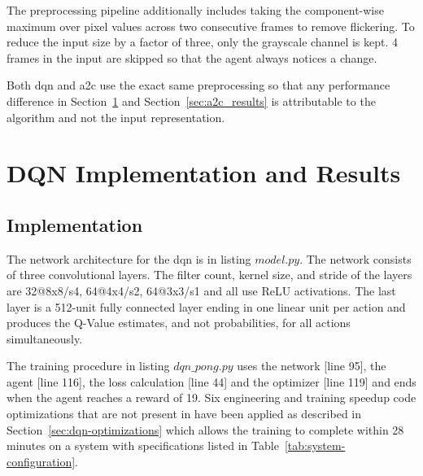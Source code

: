 The preprocessing pipeline \citep[p.~534]{mnihHumanlevelControlDeep2015} additionally includes taking the component-wise maximum over pixel values across two consecutive frames to remove flickering. To reduce the input size by a factor of three, only the grayscale channel is kept. 4 frames in the input are skipped so that the agent always notices a change.

Both \acrshort{dqn} and \acrshort{a2c} use the exact same preprocessing so that any performance difference in Section~\ref{sec:dqn_results} and Section~\ref{sec:a2c_results} is attributable to the algorithm and not the input representation.

\section{DQN Implementation and Results}
\label{sec:dqn_results}

\subsection{Implementation}

The network architecture for the \acrshort{dqn} is in listing $\hyperref[code:dqn_core_model]{model.py}$. The network consists of three convolutional layers. The filter count, kernel size, and stride of the layers are 32@8x8/s4, 64@4x4/s2, 64@3x3/s1 and all use ReLU activations. The last layer is a 512-unit fully connected layer ending in one linear unit per action and produces the Q-Value estimates, and not probabilities, for all actions simultaneously.

The training procedure in listing $\hyperref[code:dqn_dqn_pong]{dqn\_pong.py}$ uses the network [line 95], the agent [line 116], the loss calculation [line 44] and the optimizer [line 119] and ends when the agent reaches a reward of 19. Six engineering and training speedup code optimizations that are not present in \citet{mnihHumanlevelControlDeep2015} have been applied as described in Section~\ref{sec:dqn-optimizations} which allows the training to complete within 28 minutes on a system with specifications listed in Table~\ref{tab:system-configuration}.

